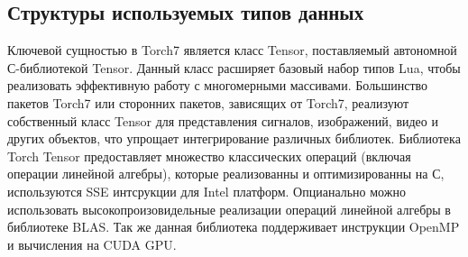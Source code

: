 \documentclass[a4paper,english,russian]{G2-105}
\begin{document}
\subsection{Структуры используемых типов данных}
\par Ключевой сущностью в Torch7 является класс Tensor, поставляемый автономной С-библиотекой Tensor. Данный класс расширяет базовый набор типов Lua, чтобы реализовать эффективную работу с многомерными массивами. Большинство пакетов Torch7 или сторонних пакетов, зависящих от Torch7, реализуют собственный класс Tensor для представления сигналов, изображений, видео и других объектов, что упрощает интегрирование различных библиотек. Библиотека Torch Tensor предоставляет множество классических операций (включая операции линейной алгебры), которые реализованны и оптимизированны на С, используются SSE интсрукции для Intel платформ. Опцианально можно использовать высокопроизовидельные реализации операций линейной алгебры в библиотеке BLAS. Так же данная библиотека поддерживает инструкции OpenMP и вычисления на CUDA GPU.
\end{document}
